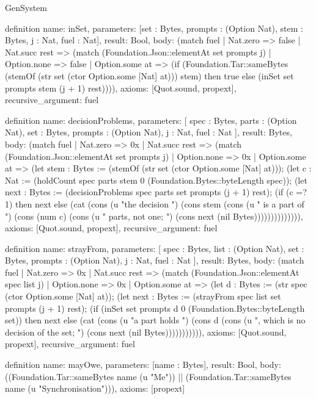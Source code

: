 \begin{lexlean}{GenSystem}
\begin{semanticmodule}
{definition{
  name: inSet,
  parameters: [set : Bytes, prompts : (Option Nat), stem : Bytes, j : Nat, fuel : Nat],
  result: Bool,
  body: (match fuel
    | Nat.zero => false
    | Nat.succ rest => (match (Foundation.Json::elementAt set prompts j)
      | Option.none => false
      | Option.some at => (if (Foundation.Tar::sameBytes (stemOf (str set (ctor Option.some [Nat] at))) stem) then true else (inSet set prompts stem (j + 1) rest)))),
  axioms: [Quot.sound, propext],
  recursive_argument: fuel
}

definition{
  name: decisionProblems,
  parameters: [
    spec : Bytes,
    parts : (Option Nat),
    set : Bytes,
    prompts : (Option Nat),
    j : Nat,
    fuel : Nat
  ],
  result: Bytes,
  body: (match fuel
    | Nat.zero => 0x
    | Nat.succ rest => (match (Foundation.Json::elementAt set prompts j)
      | Option.none => 0x
      | Option.some at => (let stem : Bytes := (stemOf (str set (ctor Option.some [Nat] at))); (let c : Nat := (holdCount spec parts stem 0 (Foundation.Bytes::byteLength spec)); (let next : Bytes := (decisionProblems spec parts set prompts (j + 1) rest); (if (c =? 1) then next else (cat (cons (u "the decision ") (cons stem (cons (u " is a part of ") (cons (num c) (cons (u " parts, not one; ") (cons next (nil Bytes)))))))))))))),
  axioms: [Quot.sound, propext],
  recursive_argument: fuel
}

definition{
  name: strayFrom,
  parameters: [
    spec : Bytes,
    list : (Option Nat),
    set : Bytes,
    prompts : (Option Nat),
    j : Nat,
    fuel : Nat
  ],
  result: Bytes,
  body: (match fuel
    | Nat.zero => 0x
    | Nat.succ rest => (match (Foundation.Json::elementAt spec list j)
      | Option.none => 0x
      | Option.some at => (let d : Bytes := (str spec (ctor Option.some [Nat] at)); (let next : Bytes := (strayFrom spec list set prompts (j + 1) rest); (if (inSet set prompts d 0 (Foundation.Bytes::byteLength set)) then next else (cat (cons (u "a part holds ") (cons d (cons (u ", which is no decision of the set; ") (cons next (nil Bytes))))))))))),
  axioms: [Quot.sound, propext],
  recursive_argument: fuel
}

definition{
  name: mayOwe,
  parameters: [name : Bytes],
  result: Bool,
  body: ((Foundation.Tar::sameBytes name (u "Me")) || (Foundation.Tar::sameBytes name (u "Synchronisation"))),
  axioms: [propext]
}

}
\end{semanticmodule}
\end{lexlean}
